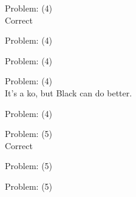 \documentclass[11pt]{article}
\begin{document}
\begin{minipage}[t]{0.5\textwidth}
  {\centering
  
  Problem: (4)\\
  Correct\\
  }
\end{minipage}
\begin{minipage}[t]{0.5\textwidth}
  {\centering
  
  Problem: (4)\\
  
  }
\end{minipage}
\begin{minipage}[t]{0.5\textwidth}
  {\centering
  
  Problem: (4)\\
  
  }
\end{minipage}
\begin{minipage}[t]{0.5\textwidth}
  {\centering
  
  Problem: (4)\\
  It's a ko, but Black can do better.\\
  }
\end{minipage}
\begin{minipage}[t]{0.5\textwidth}
  {\centering
  
  Problem: (4)\\
  
  }
\end{minipage}
\begin{minipage}[t]{0.5\textwidth}
  {\centering
  
  Problem: (5)\\
  Correct\\
  }
\end{minipage}
\begin{minipage}[t]{0.5\textwidth}
  {\centering
  
  Problem: (5)\\
  
  }
\end{minipage}
\begin{minipage}[t]{0.5\textwidth}
  {\centering
  
  Problem: (5)\\
  
  }
\end{minipage}
\end{document}
